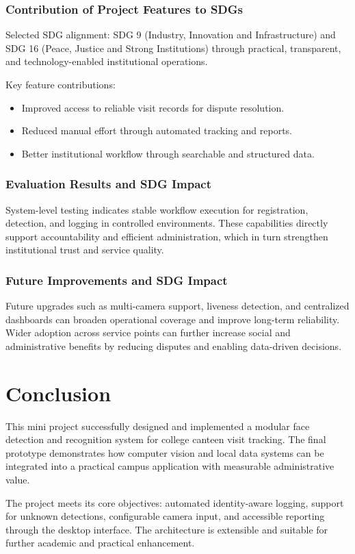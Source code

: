 \documentclass{fisatprojectfinal}
\begin{document}
\subsection{Contribution of Project Features to SDGs}
Selected SDG alignment: SDG 9 (Industry, Innovation and Infrastructure) and SDG 16 (Peace, Justice and Strong Institutions) through practical, transparent, and technology-enabled institutional operations.

Key feature contributions:
\begin{itemize}
	\item Improved access to reliable visit records for dispute resolution.
	\item Reduced manual effort through automated tracking and reports.
	\item Better institutional workflow through searchable and structured data.
\end{itemize}

\subsection{Evaluation Results and SDG Impact}
System-level testing indicates stable workflow execution for registration, detection, and logging in controlled environments. These capabilities directly support accountability and efficient administration, which in turn strengthen institutional trust and service quality.

\subsection{Future Improvements and SDG Impact}
Future upgrades such as multi-camera support, liveness detection, and centralized dashboards can broaden operational coverage and improve long-term reliability. Wider adoption across service points can further increase social and administrative benefits by reducing disputes and enabling data-driven decisions.

\chapter{Conclusion}
This mini project successfully designed and implemented a modular face detection and recognition system for college canteen visit tracking. The final prototype demonstrates how computer vision and local data systems can be integrated into a practical campus application with measurable administrative value.

The project meets its core objectives: automated identity-aware logging, support for unknown detections, configurable camera input, and accessible reporting through the desktop interface. The architecture is extensible and suitable for further academic and practical enhancement.
\end{document}
